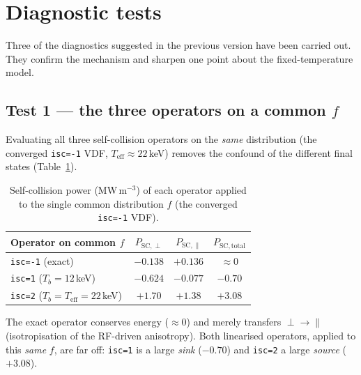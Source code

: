 \documentclass[11pt,a4paper]{article}
\begin{document}
\section{Diagnostic tests}
\label{sec:tests}

Three of the diagnostics suggested in the previous version have been carried
out. They confirm the mechanism and sharpen one point about the
fixed-temperature model.

\subsection{Test 1 --- the three operators on a common \texorpdfstring{$f$}{f}}

Evaluating all three self-collision operators on the \emph{same} distribution
(the converged \texttt{isc=-1} VDF, $T_\text{eff}\approx22$\,keV) removes the
confound of the different final states (Table~\ref{tab:commonf}).

\begin{table}[h]
\centering
\caption{Self-collision power (MW\,m$^{-3}$) of each operator applied to the
  single common distribution $f$ (the converged \texttt{isc=-1} VDF).}
\label{tab:commonf}
\begin{tabular}{lccc}
\toprule
Operator on common $f$ & $P_{\mathrm{SC},\perp}$ & $P_{\mathrm{SC},\parallel}$ & $P_{\mathrm{SC,total}}$ \\
\midrule
\texttt{isc=-1} (exact)                      & $-0.138$ & $+0.136$ & $\approx 0$ \\
\texttt{isc=1} ($T_b=12$\,keV)               & $-0.624$ & $-0.077$ & $-0.70$ \\
\texttt{isc=2} ($T_b=T_\text{eff}=22$\,keV)  & $+1.70$  & $+1.38$  & $+3.08$ \\
\bottomrule
\end{tabular}
\end{table}

The exact operator conserves energy ($\approx0$) and merely transfers
$\perp\!\to\!\parallel$ (isotropisation of the RF-driven anisotropy). Both
linearised operators, applied to this \emph{same} $f$, are far off:
\texttt{isc=1} is a large \emph{sink} ($-0.70$) and \texttt{isc=2} a large
\emph{source} ($+3.08$).
\end{document}
